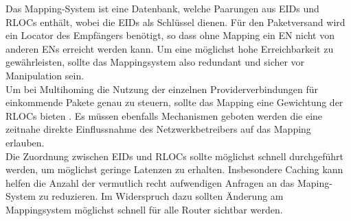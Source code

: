 Das Mapping-System ist eine Datenbank, welche Paarungen aus EIDs und RLOCs enthält, wobei die EIDs als Schlüssel dienen. Für den Paketversand wird ein Locator des Empfängers benötigt, so dass ohne Mapping ein EN nicht von anderen ENs erreicht werden kann. Um eine möglichst hohe Erreichbarkeit zu gewährleisten, sollte das Mappingsystem also redundant und sicher vor Manipulation sein. \\
Um bei Multihoming die Nutzung der einzelnen Providerverbindungen für einkommende Pakete genau zu steuern, sollte das Mapping eine Gewichtung der RLOCs bieten \cite{mathy:2008:dht}. Es müssen ebenfalls Mechanismen geboten werden die eine zeitnahe direkte Einflussnahme des Netzwerkbetreibers auf das Mapping erlauben. \\
Die Zuordnung zwischen EIDs und RLOCs sollte möglichst schnell durchgeführt werden, um möglichst geringe Latenzen zu erhalten. Insbesondere Caching kann helfen die Anzahl der vermutlich recht aufwendigen Anfragen an das Maping-System zu reduzieren. Im Widerspruch dazu sollten Änderung am Mappingsystem möglichst schnell für alle Router sichtbar werden. 

